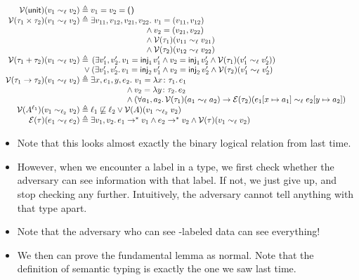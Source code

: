 \documentclass{lecturenotes}
\newcommand{\tabs}[3]{\ensuremath{\lambda #1 \colon #2.\,#3}}
\newcommand{\utype}{\textsf{unit}\xspace}
\newcommand{\unit}{\ensuremath{\textsf{(}\mkern0.5mu\textsf{)}}}
\newcommand{\prodtype}[2]{\ensuremath{#1 \times #2}}
\newcommand{\sumtype}[2]{\ensuremath{#1 + #2}}
\newcommand{\injl}[1]{\ensuremath{\textsf{inj}_1\mkern2mu#1}}
\newcommand{\injr}[1]{\ensuremath{\textsf{inj}_2\mkern3mu#1}}
\newcommand{\priv}{\text{secret}}
\begin{document}
$$
\begin{array}{r@{\;\triangleq\;}l}
  \mathcal{V}(\utype)(v_1 \sim_\ell v_2) & v_1 = v_2 = \unit\\
  \mathcal{V}(\prodtype{\tau_1}{\tau_2})(v_1 \sim_\ell v_2) & \exists v_{11}, v_{12}, v_{21}, v_{22}.\, \hspace{-1.5em}\begin{array}[t]{l}\hspace{1.15em}v_1 = (v_{11}, v_{12})\\ {} \land v_2 = (v_{21}, v_{22})\\ {} \land \mathcal{V}(\tau_1)(v_{11} \sim_\ell v_{21})\\ {} \land \mathcal{V}(\tau_2)(v_{12} \sim_\ell v_{22})\end{array}\\[1em]
  \mathcal{V}(\sumtype{\tau_1}{\tau_2})(v_1 \sim_\ell v_2) & \hspace{-1.5em}\begin{array}[t]{l}\hspace{1.15em}(\exists v'_1, v'_2.\, v_1 = \injl{v'_1} \land v_2 = \injl{v'_2} \land \mathcal{V}(\tau_1)(v'_1 \sim_\ell v'_2))\\ {} \lor (\exists v'_1, v'_2.\,v_1 = \injr{v'_1} \land v_2 = \injr{v'_2} \land \mathcal{V}(\tau_2)(v'_1 \sim_\ell v'_2)\end{array}\\
  \mathcal{V}(\tau_1 \to \tau_2)(v_1 \sim_\ell v_2) & \exists x, e_1, y, e_2.\, \hspace{-1.5em}\begin{array}[t]{l}\hspace{1.15em}v_1 = \tabs{x}{\tau_1}{e_1}\\{} \land v_2 = \tabs{y}{\tau_2}{e_2}\\{} \land (\forall a_1, a_2.\, \mathcal{V}(\tau_1)(a_1 \sim_\ell a_2) \to \mathcal{E}(\tau_2)(e_1[x \mapsto a_1] \sim_\ell e_2[y \mapsto a_2])\end{array}\\
  \mathcal{V}(A^{\ell_1})(v_1 \sim_{\ell_2} v_2) & \ell_1 \not\sqsubseteq \ell_2 \lor \mathcal{V}(A)(v_1 \sim_{\ell_2} v_2)\\
  \mathcal{E}(\tau)(e_1 \sim_\ell e_2) & \exists v_1, v_2.\, e_1 \to^\ast v_1 \land e_2 \to^\ast v_2 \land \mathcal{V}(\tau)(v_1 \sim_\ell v_2)
\end{array}
$$

\begin{itemize}
\item Note that this looks almost exactly the binary logical relation from last time.
\item However, when we encounter a label in a type, we first check whether the adversary can see information with that label.
  If not, we just give up, and stop checking any further.
  Intuitively, the adversary cannot tell anything with that type apart.
\item Note that the adversary who can see \priv{}-labeled data can see everything!
\item We then can prove the fundamental lemma as normal.
  Note that the definition of semantic typing is exactly the one we saw last time.
\end{itemize}
\end{document}

